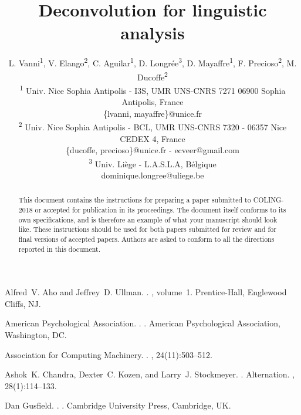\documentclass[11pt]{article}
\title{Deconvolution for linguistic analysis}
\author{
L. Vanni\textsuperscript{1}, V. Elango\textsuperscript{2}, C. Aguilar\textsuperscript{1}, D. Longrée\textsuperscript{3}, D. Mayaffre\textsuperscript{1}, F. Precioso\textsuperscript{2}, M. Ducoffe\textsuperscript{2}\\
  \textsuperscript{1} Univ. Nice Sophia Antipolis - I3S, UMR UNS-CNRS 7271 06900 Sophia Antipolis, France \\
  \{lvanni, mayaffre\}@unice.fr \\
  \textsuperscript{2} Univ. Nice Sophia Antipolis - BCL, UMR UNS-CNRS 7320 - 06357 Nice CEDEX 4, France \\
  \{ducoffe, precioso\}@unice.fr - ecveer@gmail.com \\
  \textsuperscript{3} Univ. Liège - L.A.S.L.A, Bélgique \\
  dominique.longree@uliege.be\\}
\date{}
\begin{document}
\maketitle



\begin{abstract}
  This document contains the instructions for preparing a paper submitted
  to COLING-2018 or accepted for publication in its proceedings. The document itself
  conforms to its own specifications, and is therefore an example of
  what your manuscript should look like. These instructions should be
  used for both papers submitted for review and for final versions of
  accepted papers. Authors are asked to conform to all the directions
  reported in this document.
\end{abstract}











\begin{thebibliography}{}

Alfred~V. Aho and Jeffrey~D. Ullman.
.
, volume~1.
\newblock Prentice-{Hall}, Englewood Cliffs, NJ.

{American Psychological Association}.
.
.
\newblock American Psychological Association, Washington, DC.

{Association for Computing Machinery}.
.
, 24(11):503--512.

Ashok~K. Chandra, Dexter~C. Kozen, and Larry~J. Stockmeyer.
.
\newblock Alternation.
,
  28(1):114--133.

Dan Gusfield.
.
.
\newblock Cambridge University Press, Cambridge, UK.

\end{thebibliography}
\end{document}
